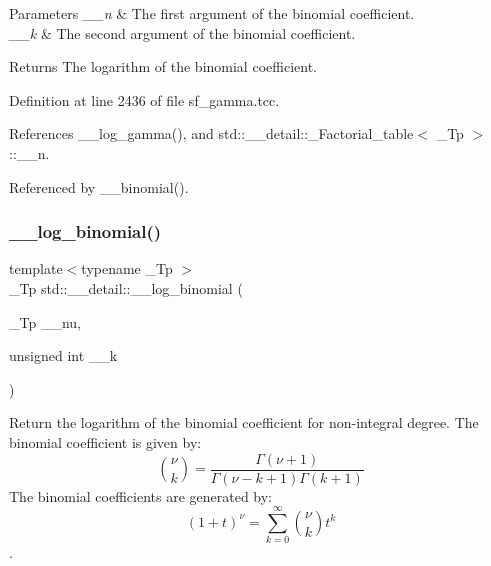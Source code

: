 \begin{DoxyParams}{Parameters}
{\em \+\_\+\+\_\+n} & The first argument of the binomial coefficient. \\
\hline
{\em \+\_\+\+\_\+k} & The second argument of the binomial coefficient. \\
\hline
\end{DoxyParams}
\begin{DoxyReturn}{Returns}
The logarithm of the binomial coefficient. 
\end{DoxyReturn}


Definition at line 2436 of file sf\+\_\+gamma.\+tcc.



References \+\_\+\+\_\+log\+\_\+gamma(), and std\+::\+\_\+\+\_\+detail\+::\+\_\+\+Factorial\+\_\+table$<$ \+\_\+\+Tp $>$\+::\+\_\+\+\_\+n.



Referenced by \+\_\+\+\_\+binomial().

\mbox{\label{namespacestd_1_1____detail_af8613458310f575d1a1b162553abe4aa}} 
\subsubsection{\texorpdfstring{\+\_\+\+\_\+log\+\_\+binomial()}{\_\_log\_binomial()}\hspace{0.1cm}{\footnotesize\ttfamily [2/2]}}
{\footnotesize\ttfamily template$<$typename \+\_\+\+Tp $>$ \\
\+\_\+\+Tp std\+::\+\_\+\+\_\+detail\+::\+\_\+\+\_\+log\+\_\+binomial (\begin{DoxyParamCaption}\item[{\+\_\+\+Tp}]{\+\_\+\+\_\+nu,  }\item[{unsigned int}]{\+\_\+\+\_\+k }\end{DoxyParamCaption})}



Return the logarithm of the binomial coefficient for non-\/integral degree. The binomial coefficient is given by\+: \[ \binom{\nu}{k} = \frac{\Gamma(\nu+1)}{\Gamma(\nu-k+1) \Gamma(k+1)} \] The binomial coefficients are generated by\+: \[ \left(1 + t\right)^\nu = \sum_{k=0}^\infty \binom{\nu}{k} t^k \]. 


